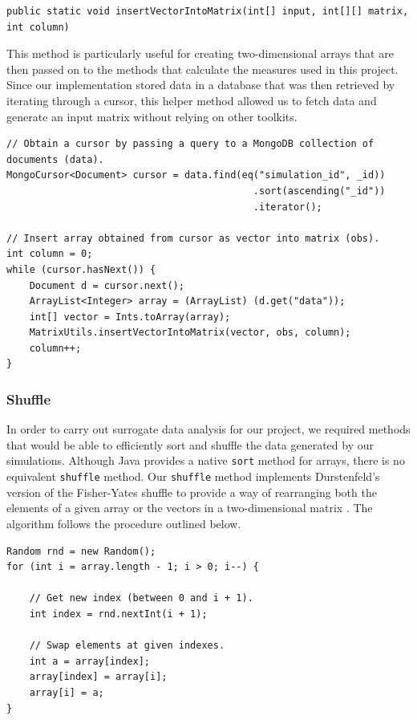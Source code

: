 \documentclass[a4paper,11pt]{article}
\begin{document}
\begin{verbatim}
public static void insertVectorIntoMatrix(int[] input, int[][] matrix, int column)
\end{verbatim}

This method is particularly useful for creating two-dimensional arrays that are then passed on to the methods that calculate the measures used in this project. Since our implementation stored data in a database that was then retrieved by iterating through a cursor, this helper method allowed us to fetch data and generate an input matrix without relying on other toolkits.

\begin{verbatim}
// Obtain a cursor by passing a query to a MongoDB collection of documents (data).
MongoCursor<Document> cursor = data.find(eq("simulation_id", _id))
                                           .sort(ascending("_id"))
                                           .iterator();

// Insert array obtained from cursor as vector into matrix (obs).
int column = 0;
while (cursor.hasNext()) {
	Document d = cursor.next();
	ArrayList<Integer> array = (ArrayList) (d.get("data"));
	int[] vector = Ints.toArray(array);
	MatrixUtils.insertVectorIntoMatrix(vector, obs, column);
	column++;
}
\end{verbatim}

\subsubsection{Shuffle}
\label{sec:impl:shuffle}

In order to carry out surrogate data analysis for our project, we required methods that would be able to efficiently sort and shuffle the data generated by our simulations. Although Java provides a native \texttt{sort} method for arrays, there is no equivalent \texttt{shuffle} method. Our \texttt{shuffle} method implements Durstenfeld's version of the Fisher-Yates shuffle to provide a way of rearranging both the elements of a given array or the vectors in a two-dimensional matrix \cite{Durstenfeld1964}. The algorithm follows the procedure outlined below.

\begin{verbatim}
Random rnd = new Random();
for (int i = array.length - 1; i > 0; i--) {

	// Get new index (between 0 and i + 1).
	int index = rnd.nextInt(i + 1);

	// Swap elements at given indexes.
	int a = array[index];
	array[index] = array[i];
	array[i] = a;
}
\end{verbatim}
\end{document}
